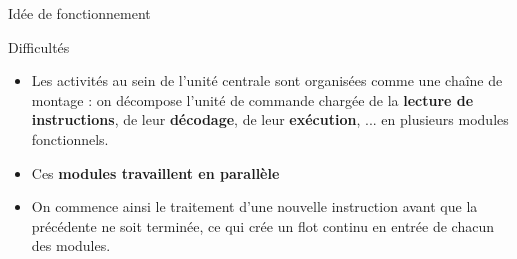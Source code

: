 %
\begin{Frame}{Idée de fonctionnement}
%    

\begin{block}{Difficultés}
       \begin{center}
 	\begin{itemize}
         \item Les activités au sein de l'unité centrale sont organisées comme une chaîne de montage : on décompose l'unité de commande chargée de la \textbf{lecture de instructions}, de leur \textbf{décodage}, de leur \textbf{exécution}, ... en plusieurs modules fonctionnels.
	\item Ces \textbf{modules travaillent en parallèle}
	\item On commence ainsi le traitement d'une nouvelle instruction avant que la précédente ne soit terminée, ce qui crée un flot continu en entrée de chacun des modules.
        \end{itemize}
       \end{center}
      \end{block}   



\end{Frame}


